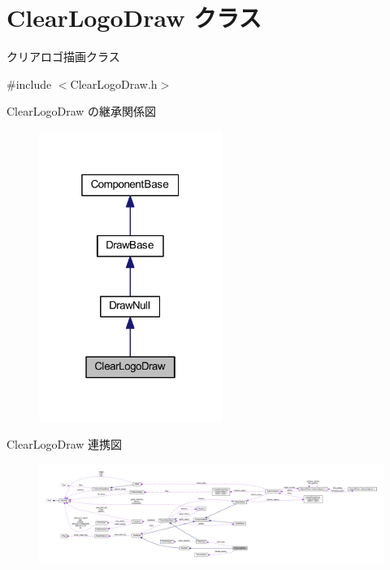\hypertarget{class_clear_logo_draw}{}\section{Clear\+Logo\+Draw クラス}
\label{class_clear_logo_draw}


クリアロゴ描画クラス  




{\ttfamily \#include $<$Clear\+Logo\+Draw.\+h$>$}



Clear\+Logo\+Draw の継承関係図\nopagebreak
\begin{figure}[H]
\begin{center}
\leavevmode
\includegraphics[width=169pt]{class_clear_logo_draw__inherit__graph}
\end{center}
\end{figure}


Clear\+Logo\+Draw 連携図\nopagebreak
\begin{figure}[H]
\begin{center}
\leavevmode
\includegraphics[width=350pt]{class_clear_logo_draw__coll__graph}
\end{center}
\end{figure}

